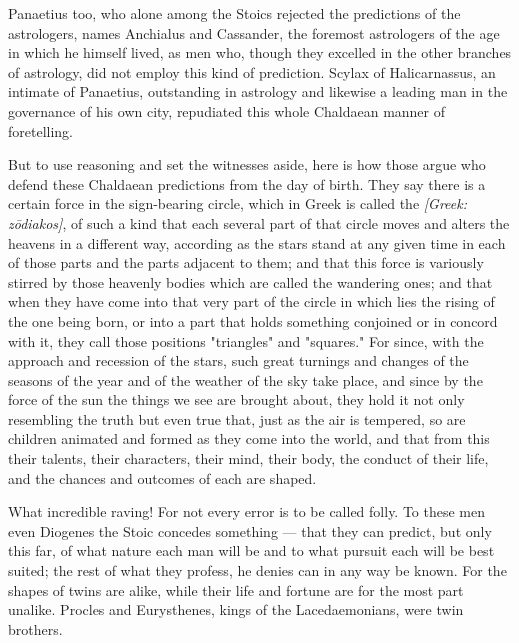  Panaetius too, who alone among the Stoics rejected the predictions of the astrologers, names Anchialus and Cassander, the foremost astrologers of the age in which he himself lived, as men who, though they excelled in the other branches of astrology, did not employ this kind of prediction. Scylax of Halicarnassus, an intimate of Panaetius, outstanding in astrology and likewise a leading man in the governance of his own city, repudiated this whole Chaldaean manner of foretelling.

 But to use reasoning and set the witnesses aside, here is how those argue who defend these Chaldaean predictions from the day of birth. They say there is a certain force in the sign-bearing circle, which in Greek is called the \textit{[Greek: zōdiakos]}, of such a kind that each several part of that circle moves and alters the heavens in a different way, according as the stars stand at any given time in each of those parts and the parts adjacent to them; and that this force is variously stirred by those heavenly bodies which are called the wandering ones; and that when they have come into that very part of the circle in which lies the rising of the one being born, or into a part that holds something conjoined or in concord with it, they call those positions "triangles" and "squares." For since, with the approach and recession of the stars, such great turnings and changes of the seasons of the year and of the weather of the sky take place, and since by the force of the sun the things we see are brought about, they hold it not only resembling the truth but even true that, just as the air is tempered, so are children animated and formed as they come into the world, and that from this their talents, their characters, their mind, their body, the conduct of their life, and the chances and outcomes of each are shaped.

 What incredible raving! For not every error is to be called folly. To these men even Diogenes the Stoic concedes something — that they can predict, but only this far, of what nature each man will be and to what pursuit each will be best suited; the rest of what they profess, he denies can in any way be known. For the shapes of twins are alike, while their life and fortune are for the most part unalike. Procles and Eurysthenes, kings of the Lacedaemonians, were twin brothers.

